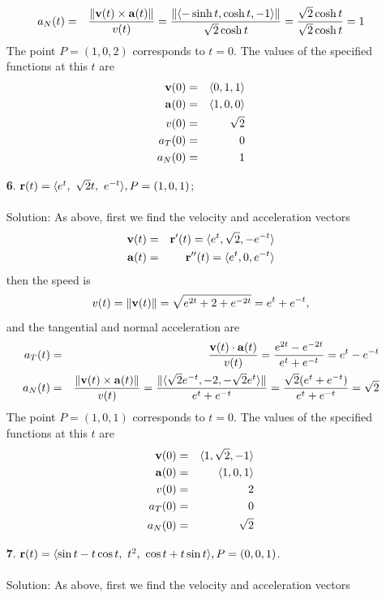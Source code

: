 \documentclass[12pt]{amsbook}
\newcommand{\la}{\langle}
\newcommand{\ra}{\rangle}
\begin{document}
\begin{enumerate}
\begin{eqnarray*}
  a_N(t)&=&\frac{\|{\bf v}(t)\times{\bf a}(t)\|}{v(t)}=\frac{\|\la -\sinh t,\cosh t,-1 \ra\|}{\sqrt{2}\cosh t}=\frac{\sqrt{2}\cosh t}{\sqrt{2}\cosh t}=1
\end{eqnarray*}  
The point $P=(1,0,2)$ corresponds to $t=0$. The values of the specified functions at this $t$ are
\begin{eqnarray*}
{\bf v}(0)&=&\la 0, 1, 1 \ra\\
{\bf a}(0)&=&\la 1, 0, 0 \ra  \\
v(0)&=&\sqrt{2}\\
a_T(0)&=&0\\
a_N(0)&=&1
\end{eqnarray*}
  \item[{\small\bf 6}.] ${\bf r}(t)=\la e^t,\ \sqrt{2}t,\ e^{-t}\ra, P=(1,0,1)$;
  \\
  \\
  {\sc Solution}: As above, first we find the velocity and acceleration vectors
  \begin{eqnarray*}
  {\bf v}(t)&=&{\bf r}'(t)=\la e^t,\sqrt{2},-e^{-t} \ra\\
  {\bf a}(t)&=&{\bf r}''(t)=\la e^t,0,e^{-t} \ra 
  \end{eqnarray*}
  then the speed is
  $$v(t)=\|{\bf v}(t)\|=\sqrt{e^{2t}+2+e^{-2t}}=e^t+e^{-t},$$
  and the tangential and normal acceleration are
\begin{eqnarray*}
  a_T(t)&=&\frac{{\bf v}(t)\cdot{\bf a}(t)}{v(t)}=\frac{e^{2t}-e^{-2t}}{e^t+e^{-t}}=e^t-e^{-t}\\
  a_N(t)&=&\frac{\|{\bf v}(t)\times{\bf a}(t)\|}{v(t)}=\frac{\|\la \sqrt{2}e^{-t},-2,-\sqrt{2}e^t \ra\|}{e^t+e^{-t}}=\frac{\sqrt{2}(e^t+e^{-t})}{e^t+e^{-t}}=\sqrt{2}
\end{eqnarray*}  
The point $P=(1,0,1)$ corresponds to $t=0$. The values of the specified functions at this $t$ are
\begin{eqnarray*}
{\bf v}(0)&=&\la 1, \sqrt{2}, -1 \ra\\
{\bf a}(0)&=&\la 1, 0, 1 \ra  \\
v(0)&=&2\\
a_T(0)&=&0\\
a_N(0)&=&\sqrt{2}
\end{eqnarray*}
  \item[{\small\bf 7}.] ${\bf r}(t)=\la \sin t-t\cos t,\ t^2 ,\ \cos t +t\sin t \ra, P=(0,0,1)$.
  \\
  \\
  {\sc Solution}: As above, first we find the velocity and acceleration vectors
  \begin{eqnarray*}

\end{eqnarray*}
\end{enumerate}
\end{document}
